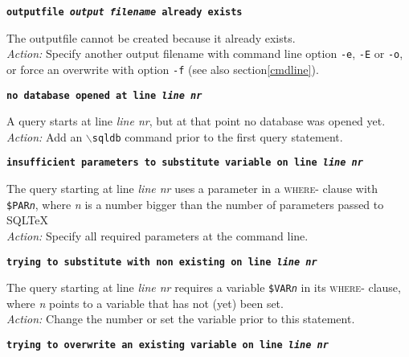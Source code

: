 \documentclass{article}
\newcommand{\bs}{\ensuremath{\backslash}}
\newcommand{\vs}{\vspace{3mm}}
\begin{document}
\vs

\noindent\textbf{\texttt{outputfile \textit{output filename} already exists}}

\vspace{1mm}

\noindent The outputfile cannot be created because it already exists.\\
\textit{Action:} Specify another output filename with command line option \texttt{-e},
\texttt{-E} or \texttt{-o}, or force an overwrite with option \texttt{-f} (see also section\ref{cmdline}).

\vs

\noindent\textbf{\texttt{no database opened at line \textit{line nr}}}

\vspace{1mm}

\noindent A query starts at line \textit{line nr}, but at that point no database was opened yet. \\
\textit{Action:} Add an \texttt{\bs sqldb} command prior to the first query statement.

\vs

\noindent\textbf{\texttt{insufficient parameters to substitute variable on line \textit{line nr}}}

\vspace{1mm}

\noindent The query starting at line \textit{line nr} uses a parameter in a \textsc{where}- clause with
\texttt{\$PAR\textit{n}}, where \textit{n} is a number bigger than the number of parameters
passed to SQL\TeX\. \\
\textit{Action:} Specify all required parameters at the command line.

\vs

\noindent\textbf{\texttt{trying to substitute with non existing on line \textit{line nr}}}

\vspace{1mm}

\noindent The query starting at line \textit{line nr} requires a variable \texttt{\$VAR\textit{n}} in its
\textsc{where}- clause, where \textit{n} points to a variable that has not (yet) been set. \\
\textit{Action:} Change the number or set the variable prior to this statement.

\vs

\noindent\textbf{\texttt{trying to overwrite an existing variable on line \textit{line nr}}}

\vspace{1mm}
\end{document}
